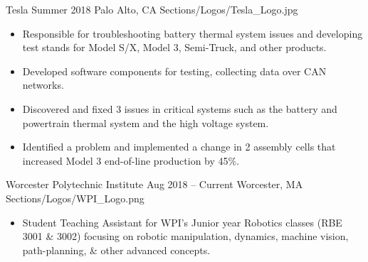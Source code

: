 \divider
{}
    {Tesla}
    {Summer 2018}
    {Palo Alto, CA}
    {Sections/Logos/Tesla_Logo.jpg}
    \begin{itemize}
        \item Responsible for troubleshooting battery thermal system issues and developing test stands for Model S/X, Model 3, Semi-Truck, and other products.
        \item Developed software components for testing, collecting data over CAN networks.
        \item Discovered and fixed 3 issues in critical systems such as the battery and powertrain thermal system and the high voltage system.
        \item Identified a problem and implemented a change in 2 assembly cells that increased Model 3 end-of-line production by 45\%.
    \end{itemize}
\divider
{}
    {Worcester Polytechnic Institute}
    {Aug 2018 -- Current}
    {Worcester, MA}
    {Sections/Logos/WPI_Logo.png}
    \begin{itemize}
        \item Student Teaching Assistant for WPI’s Junior year Robotics classes (RBE 3001 \& 3002) focusing on robotic manipulation, dynamics, machine vision, path-planning, \& other advanced concepts.
    \end{itemize}

